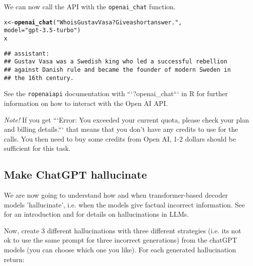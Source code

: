 \documentclass[11pt,a4paper,english]{article}\usepackage[]{graphicx}\usepackage[]{xcolor}
\makeatletter
\newcommand{\hlstr}[1]{\textcolor[rgb]{0.192,0.494,0.8}{#1}}%
\newcommand{\hlstd}[1]{\textcolor[rgb]{0.345,0.345,0.345}{#1}}%
\newcommand{\hlkwb}[1]{\textcolor[rgb]{0.69,0.353,0.396}{#1}}%
\newcommand{\hlkwc}[1]{\textcolor[rgb]{0.333,0.667,0.333}{#1}}%
\newcommand{\hlkwd}[1]{\textcolor[rgb]{0.737,0.353,0.396}{\textbf{#1}}}%
\newenvironment{kframe}{%
 \def\at@end@of@kframe{}%
 \ifinner\ifhmode%
  \def\at@end@of@kframe{\end{minipage}}%
  \begin{minipage}{\columnwidth}%
 \fi\fi%
 \def\FrameCommand##1{\hskip\@totalleftmargin \hskip-\fboxsep
 \colorbox{shadecolor}{##1}\hskip-\fboxsep
     \hskip-\linewidth \hskip-\@totalleftmargin \hskip\columnwidth}%
 \MakeFramed {\advance\hsize-\width
   \@totalleftmargin\z@ \linewidth\hsize
   \@setminipage}}%
 {\par\unskip\endMakeFramed%
 \at@end@of@kframe}
\newenvironment{knitrout}{}{} %
\makeatother
\begin{document}
We can now call the API with the \texttt{openai\_chat} function.

\begin{knitrout}\small
{}\color{fgcolor}\begin{kframe}
\begin{alltt}
\hlstd{x} \hlkwb{<-} \hlkwd{openai_chat}\hlstd{(}\hlstr{"Who is Gustav Vasa? Give a short answer."}\hlstd{,}
                 \hlkwc{model} \hlstd{=} \hlstr{"gpt-3.5-turbo"}\hlstd{)}
\hlstd{x}
\end{alltt}
\end{kframe}
\end{knitrout}

\begin{knitrout}\small
{}\color{fgcolor}\begin{kframe}
\begin{verbatim}
## assistant:
## Gustav Vasa was a Swedish king who led a successful rebellion
## against Danish rule and became the founder of modern Sweden in
## the 16th century.
\end{verbatim}
\end{kframe}
\end{knitrout}

See the \texttt{ropenaiapi} documentation with ```?openai\_chat``` in R for further information on how to interact with the Open AI API.

\emph{Note!} If you get ```Error: You exceeded your current quota, please check your plan and billing details.``` that means that you don't have any credits to use for the calls. You then need to buy some credits from Open AI, 1-2 dollars should be sufficient for this task.


\subsection{Make ChatGPT hallucinate}

We are now going to understand how and when transformer-based decoder models 'hallucinate', i.e. when the models give factual incorrect information. See \cite[][, Section 7.1.2]{zhao2023survey} for an introduction and \cite{huang2023survey} for details on hallucinations in LLMs.

Now, create 3 different hallucinations with three different strategies (i.e. its not ok to use the same prompt for three incorrect generations) from the chatGPT models (you can choose which one you like). For each generated hallucination return:
\end{document}
